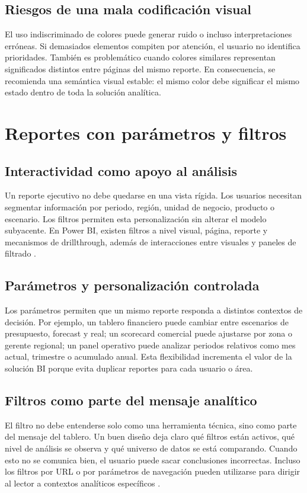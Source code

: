 \documentclass[12pt]{article}
\begin{document}
\subsection{Riesgos de una mala codificación visual}
El uso indiscriminado de colores puede generar ruido o incluso interpretaciones erróneas. Si demasiados elementos compiten por atención, el usuario no identifica prioridades. También es problemático cuando colores similares representan significados distintos entre páginas del mismo reporte. En consecuencia, se recomienda una semántica visual estable: el mismo color debe significar el mismo estado dentro de toda la solución analítica.

\section{Reportes con parámetros y filtros}
\subsection{Interactividad como apoyo al análisis}
Un reporte ejecutivo no debe quedarse en una vista rígida. Los usuarios necesitan segmentar información por periodo, región, unidad de negocio, producto o escenario. Los filtros permiten esta personalización sin alterar el modelo subyacente. En Power BI, existen filtros a nivel visual, página, reporte y mecanismos de drillthrough, además de interacciones entre visuales y paneles de filtrado \cite{ms_filters_highlighting}.

\subsection{Parámetros y personalización controlada}
Los parámetros permiten que un mismo reporte responda a distintos contextos de decisión. Por ejemplo, un tablero financiero puede cambiar entre escenarios de presupuesto, forecast y real; un scorecard comercial puede ajustarse por zona o gerente regional; un panel operativo puede analizar periodos relativos como mes actual, trimestre o acumulado anual. Esta flexibilidad incrementa el valor de la solución BI porque evita duplicar reportes para cada usuario o área.

\subsection{Filtros como parte del mensaje analítico}
El filtro no debe entenderse solo como una herramienta técnica, sino como parte del mensaje del tablero. Un buen diseño deja claro qué filtros están activos, qué nivel de análisis se observa y qué universo de datos se está comparando. Cuando esto no se comunica bien, el usuario puede sacar conclusiones incorrectas. Incluso los filtros por URL o por parámetros de navegación pueden utilizarse para dirigir al lector a contextos analíticos específicos \cite{ms_url_filters}.
\end{document}
